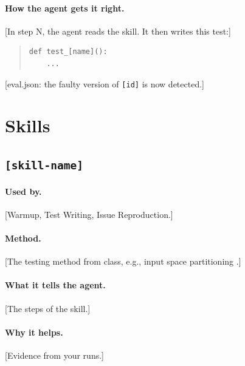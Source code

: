 \documentclass[11pt]{article}
\begin{document}
\paragraph{How the agent gets it right.}
[In step N, the agent reads the skill. It then writes this test:]
\begin{quote}\small
\begin{verbatim}
def test_[name]():
    ...
\end{verbatim}
\end{quote}
[eval.json: the faulty version of \texttt{[id]} is now detected.]

\section{Skills}

\subsection{\texttt{[skill-name]}}

\paragraph{Used by.} [Warmup, Test Writing, Issue Reproduction.]

\paragraph{Method.} [The testing method from class, e.g., input space
partitioning \citep{ammann2016introduction}.]

\paragraph{What it tells the agent.} [The steps of the skill.]

\paragraph{Why it helps.} [Evidence from your runs.]
\end{document}
